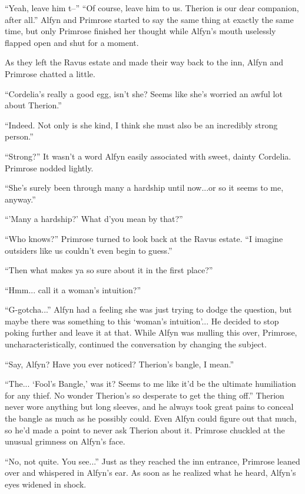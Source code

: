 ``Yeah, leave him t--'' ``Of course, leave him to us. Therion is our dear companion, after all.'' Alfyn and Primrose started to say the same thing at exactly the same time, but only Primrose finished her thought while Alfyn's mouth uselessly flapped open and shut for a moment. 

As they left the Ravus estate and made their way back to the inn, Alfyn and Primrose chatted a little.

``Cordelia's really a good egg, isn't she? Seems like she's worried an awful lot about Therion.''

``Indeed. Not only is she kind, I think she must also be an incredibly strong person.''

``Strong?'' It wasn't a word Alfyn easily associated with sweet, dainty Cordelia. Primrose nodded lightly.

``She's surely been through many a hardship until now...or so it seems to me, anyway.''

``'Many a hardship?' What d'you mean by that?''

``Who knows?'' Primrose turned to look back at the Ravus estate. ``I imagine outsiders like us couldn't even begin to guess.''

``Then what makes ya so sure about it in the first place?''

``Hmm... call it a woman's intuition?''

``G-gotcha...'' Alfyn had a feeling she was just trying to dodge the question, but maybe there was something to this `woman's intuition'... He decided to stop poking further and leave it at that. While Alfyn was mulling this over, Primrose, uncharacteristically, continued the conversation by changing the subject.

``Say, Alfyn? Have you ever noticed? Therion's bangle, I mean.''

``The... `Fool's Bangle,' was it? Seems to me like it'd be the ultimate humiliation for any thief. No wonder Therion's so desperate to get the thing off.'' Therion never wore anything but long sleeves, and he always took great pains to conceal the bangle as much as he possibly could. Even Alfyn could figure out that much, so he'd made a point to never ask Therion about it. Primrose chuckled at the unusual grimness on Alfyn's face.

``No, not quite. You see...'' Just as they reached the inn entrance, Primrose leaned over and whispered in Alfyn's ear. As soon as he realized what he heard, Alfyn's eyes widened in shock.

